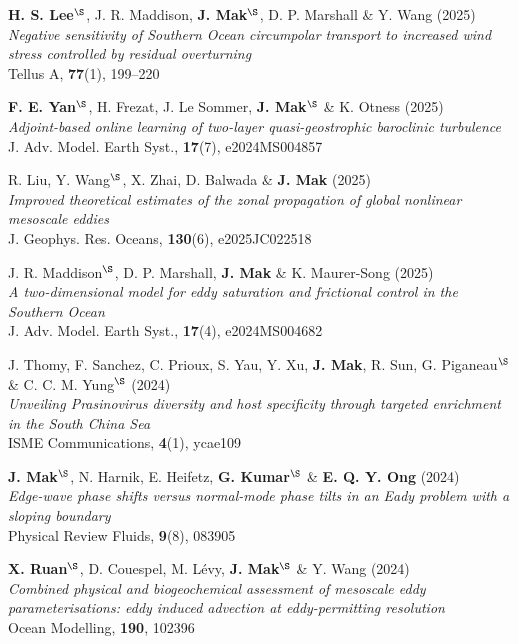 \documentclass[letterpaper]{article}
\renewenvironment{itemize}{
  \begin{list}{}{
    \setlength{\leftmargin}{1.5em}
  }
}{
  \end{list}
}
\begin{document}
\begin{itemize}
\item[28.] \textbf{H. S. Lee}$^{\S}$, J. R. Maddison, \textbf{J. Mak}$^{\S}$, D. P. Marshall \& Y. Wang (2025)\\
\textit{Negative sensitivity of Southern Ocean circumpolar transport to increased wind stress controlled by residual overturning}\\
Tellus A, \textbf{77}(1), 199--220

\item[27.] \textbf{F. E. Yan}$^{\S}$, H. Frezat, J. Le Sommer, \textbf{J. Mak}$^{\S}$ \& K. Otness (2025)\\
\textit{Adjoint-based online learning of two-layer quasi-geostrophic baroclinic turbulence}\\
J. Adv. Model. Earth Syst., \textbf{17}(7), e2024MS004857

\item[26.] R. Liu, Y. Wang$^{\S}$, X. Zhai, D. Balwada \& \textbf{J. Mak} (2025)\\
\textit{Improved theoretical estimates of the zonal propagation of global nonlinear mesoscale eddies}\\
J. Geophys. Res. Oceans, \textbf{130}(6), e2025JC022518

\item[25.] J. R. Maddison$^{\S}$, D. P. Marshall, \textbf{J. Mak} \& K. Maurer-Song (2025)\\
\textit{A two-dimensional model for eddy saturation and frictional control in the Southern Ocean}\\
J. Adv. Model. Earth Syst., \textbf{17}(4), e2024MS004682

\item[24.] J. Thomy, F. Sanchez, C. Prioux, S. Yau, Y. Xu, \textbf{J. Mak}, R. Sun, G. Piganeau$^{\S}$ \& C. C. M. Yung$^{\S}$ (2024)\\
\textit{Unveiling Prasinovirus diversity and host specificity through targeted enrichment in the South China Sea}\\
ISME Communications, \textbf{4}(1), ycae109

\item[23.] \textbf{J. Mak}$^{\S}$, N. Harnik, E. Heifetz, \textbf{G. Kumar}$^{\S}$ \& \textbf{E. Q. Y. Ong} (2024)\\
\textit{Edge-wave phase shifts versus normal-mode phase tilts in an Eady problem with a sloping boundary}\\
Physical Review Fluids, \textbf{9}(8), 083905

\item[22.] \textbf{X. Ruan}$^{\S}$, D. Couespel, M. L\'evy, \textbf{J. Mak}$^{\S}$ \& Y. Wang (2024)\\
\textit{Combined physical and biogeochemical assessment of mesoscale eddy parameterisations: eddy induced advection at eddy-permitting resolution}\\
Ocean Modelling, \textbf{190}, 102396


\end{itemize}
\end{document}
